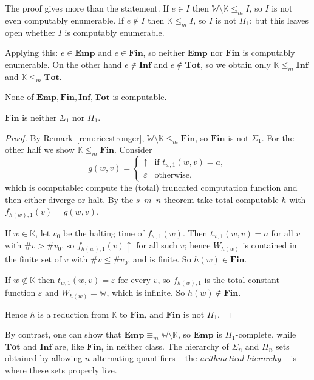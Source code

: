 \documentclass[a4paper]{scrartcl}
\newcommand{\WW}{\mathbb{W}}
\newcommand{\KK}{\mathbb{K}}
\newcommand{\eps}{\varepsilon}
\newcommand{\Emp}{\mathbf{Emp}}
\newcommand{\Tot}{\mathbf{Tot}}
\newcommand{\Inf}{\mathbf{Inf}}
\newcommand{\Fine}{\mathbf{Fin}}
\begin{document}
\begin{remark}\label{rem:ricestronger}
	The proof gives more than the statement. If $e \in I$ then $\WW\setminus\KK \leq_m I$, so $I$ is not even computably enumerable. If $e \notin I$ then $\KK \leq_m I$, so $I$ is not $\Pi_1$; but this leaves open whether $I$ is computably enumerable.

	Applying this: $e \in \Emp$ and $e \in \Fine$, so neither $\Emp$ nor $\Fine$ is computably enumerable. On the other hand $e \notin\Inf$ and $e\notin\Tot$, so we obtain only $\KK\leq_m\Inf$ and $\KK\leq_m\Tot$.
\end{remark}

\begin{corollary}
	None of $\Emp, \Fine, \Inf, \Tot$ is computable.
\end{corollary}

\begin{theorem}
	$\Fine$ is neither $\Sigma_1$ nor $\Pi_1$.
\end{theorem}

\begin{proof}
	By Remark~\ref{rem:ricestronger}, $\WW\setminus\KK\leq_m\Fine$, so $\Fine$ is not $\Sigma_1$. For the other half we show $\KK\leq_m\Fine$. Consider
	$$g(w,v) = \begin{cases}\uparrow & \text{if } t_{w,1}(w,v) = a, \\ \eps & \text{otherwise},\end{cases}$$
	which is computable: compute the (total) truncated computation function and then either diverge or halt. By the $s$--$m$--$n$ theorem take total computable $h$ with $f_{h(w),1}(v) = g(w,v)$.

	If $w \in \KK$, let $v_0$ be the halting time of $f_{w,1}(w)$. Then $t_{w,1}(w,v) = a$ for all $v$ with $\#v > \#v_0$, so $f_{h(w),1}(v)\!\uparrow$ for all such $v$; hence $W_{h(w)}$ is contained in the finite set of $v$ with $\#v \leq \#v_0$, and is finite. So $h(w)\in\Fine$.

	If $w \notin\KK$ then $t_{w,1}(w,v) = \eps$ for every $v$, so $f_{h(w),1}$ is the total constant function $\eps$ and $W_{h(w)} = \WW$, which is infinite. So $h(w)\notin\Fine$.

	Hence $h$ is a reduction from $\KK$ to $\Fine$, and $\Fine$ is not $\Pi_1$.
\end{proof}

\begin{remark}
	By contrast, one can show that $\Emp \equiv_m \WW\setminus\KK$, so $\Emp$ is $\Pi_1$-complete, while $\Tot$ and $\Inf$ are, like $\Fine$, in neither class. The hierarchy of $\Sigma_n$ and $\Pi_n$ sets obtained by allowing $n$ alternating quantifiers -- the \emph{arithmetical hierarchy} -- is where these sets properly live.
\end{remark}
\end{document}
